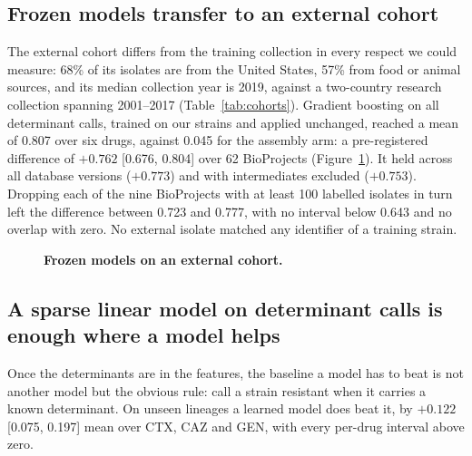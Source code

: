 \subsection*{Frozen models transfer to an external cohort}

The external cohort differs from the training collection in every respect we could measure: 68\% of
its isolates are from the United States, 57\% from food or animal sources, and its median
collection year is 2019, against a two-country research collection spanning 2001--2017
(Table~\ref{tab:cohorts}). Gradient boosting on all determinant calls, trained on our strains and
applied unchanged, reached a mean \nap{} of 0.807 over six drugs, against 0.045 for the assembly
arm: a pre-registered difference of $+0.762$ [0.676, 0.804] over 62 BioProjects
(Figure~\ref{fig:external}). It held across all database versions ($+0.773$) and with intermediates
excluded ($+0.753$). Dropping each of the nine BioProjects with at least 100 labelled isolates in
turn left the difference between 0.723 and 0.777, with no interval below 0.643 and no overlap with
zero. No external isolate matched any identifier of a training strain.

\begin{figure}[t]\centering
{}
\caption{\textbf{Frozen models on an external cohort.} }\label{fig:external}
\end{figure}

\subsection*{A sparse linear model on determinant calls is enough where a model helps}

Once the determinants are in the features, the baseline a model has to beat is not another model but
the obvious rule: call a strain resistant when it carries a known determinant. On unseen lineages a
learned model does beat it, by $+0.122$ [0.075, 0.197] mean \nap{} over CTX, CAZ and GEN, with every
per-drug interval above zero.

